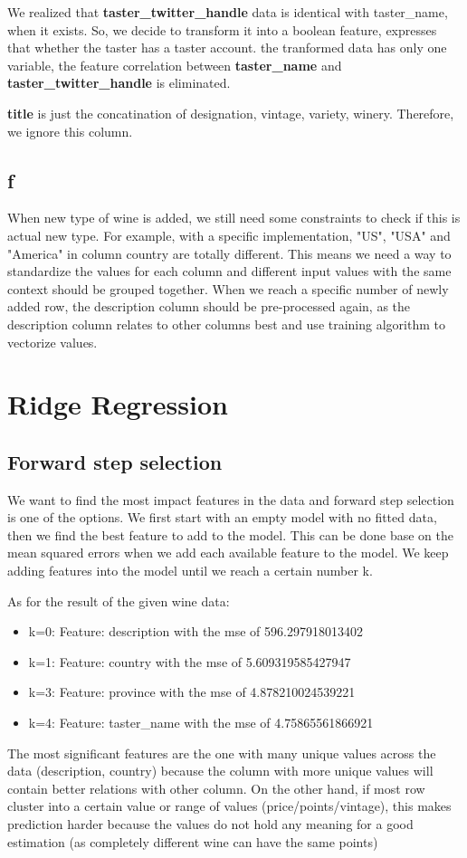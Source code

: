 \documentclass[11pt]{article}
\begin{document}
We realized that \textbf{taster_twitter_handle} data is identical with taster_name, when it exists. So, we decide to transform it into a boolean feature, expresses that whether the taster has a taster account. the tranformed data has only one variable, the feature correlation between \textbf{taster_name} and \textbf{taster_twitter_handle} is eliminated.

\textbf{title} is just the concatination of designation, vintage, variety, winery. Therefore, we ignore this column.

\subsection{f}

When new type of wine is added, we still need some constraints to check if this is actual new type. For example, with a specific implementation, "US", "USA" and "America" in column country are totally different. This means we need a way to standardize the values for each column and different input values with the same context should be grouped together. When we reach a specific number of newly added row, the description column should be pre-processed again, as the description column relates to other columns best and use training algorithm to vectorize values.
\section{Ridge Regression}

\subsection{Forward step selection}
We want to find the most impact features in the data and forward step selection is one of the options. We first start with an empty model with no fitted data, then we find the best feature to add to the model. This can be done base on the mean squared errors when we add each available feature to the model. We keep adding features into the model until we reach a certain number k.

As for the result of the given wine data:
\begin{itemize}
    \item k=0: Feature: description with the mse of 596.297918013402
    \item k=1: Feature: country with the mse of 5.609319585427947
    \item k=3: Feature: province with the mse of 4.878210024539221
    \item k=4: Feature: taster\_name with the mse of 4.75865561866921
\end{itemize}

The most significant features are the one with many unique values across the data (description, country) because the column with more unique values will contain better relations with other column. On the other hand, if most row cluster into a certain value or range of values (price/points/vintage), this makes prediction harder because the values do not hold any meaning for a good estimation (as completely different wine can have the same points)

\end{document}
